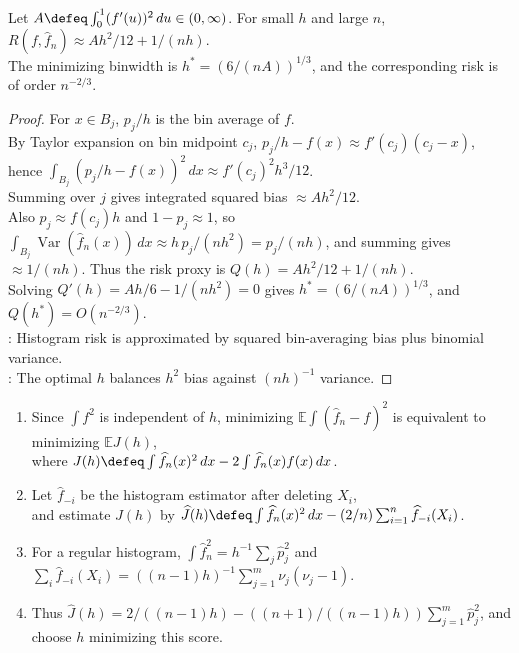 \begin{theorem} \label{thm:histogram-risk-and-optimal-binwidth} \\
Let $A\defeq\int_0^1(f'(u))^2\,du\in(0,\infty)$. For small $h$ and large $n$, $R(f,\widehat f_n)\approx Ah^2/12+1/(nh)$.\\
The minimizing binwidth is $h^*=(6/(nA))^{1/3}$, and the corresponding risk is of order $n^{-2/3}$.
\begin{proof} For $x\in B_j$, $p_j/h$ is the bin average of $f$.\\
By Taylor expansion on bin midpoint $c_j$, $p_j/h-f(x)\approx f'(c_j)(c_j-x)$, hence $\int_{B_j}(p_j/h-f(x))^2\,dx\approx f'(c_j)^2h^3/12$.\\
Summing over $j$ gives integrated squared bias $\approx Ah^2/12$.\\
Also $p_j\approx f(c_j)h$ and $1-p_j\approx1$, so $\int_{B_j}\operatorname{Var}(\widehat f_n(x))\,dx\approx h\,p_j/(nh^2)=p_j/(nh)$, and summing gives $\approx1/(nh)$.
Thus the risk proxy is $Q(h)=Ah^2/12+1/(nh)$.\\
Solving $Q'(h)=Ah/6-1/(nh^2)=0$ gives $h^*=(6/(nA))^{1/3}$, and $Q(h^*)=O(n^{-2/3})$.\\
: Histogram risk is approximated by squared bin-averaging bias plus binomial variance.\\
: The optimal $h$ balances $h^2$ bias against $(nh)^{-1}$ variance.
\end{proof}
\end{theorem}

\begin{method} \label{meth:histogram-cross-validation} 
\begin{enumerate}[label=(\roman*)]
\setlength{\itemsep}{0pt}
\item Since $\int f^2$ is independent of $h$, minimizing $\mathbb{E}\int(\widehat f_n-f)^2$ is equivalent to minimizing $\mathbb{E}J(h)$,\\
where $J(h)\defeq\int\widehat f_n(x)^2\,dx-2\int\widehat f_n(x)f(x)\,dx$.
\item Let $\widehat f_{-i}$ be the histogram estimator after deleting $X_i$,\\
and estimate $J(h)$ by $\widehat J(h)\defeq\int\widehat f_n(x)^2\,dx-(2/n)\sum_{i=1}^{n}\widehat f_{-i}(X_i)$.
\item For a regular histogram, $\int\widehat f_n^2=h^{-1}\sum_j\widehat p_j^2$ and $\sum_i\widehat f_{-i}(X_i)=((n-1)h)^{-1}\sum_{j=1}^{m}\nu_j(\nu_j-1)$.
\item Thus $\widehat J(h)=2/((n-1)h)-((n+1)/((n-1)h))\sum_{j=1}^{m}\widehat p_j^2$, and choose $h$ minimizing this score.
\end{enumerate}
\end{method}

